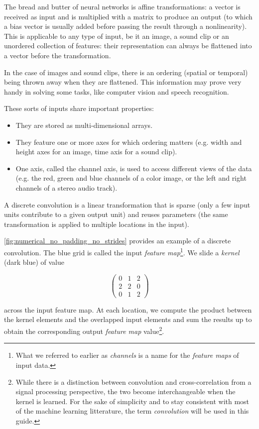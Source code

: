\documentclass{article}
\begin{document}
The bread and butter of neural networks is affine transformations: a vector is
received as input and is multiplied with a matrix to produce an output (to which
a bias vector is usually added before passing the result through a
nonlinearity). This is applicable to any type of input, be it an image, a sound
clip or an unordered collection of features: their representation can always be
flattened into a vector before the transformation.

In the case of images and sound clips, there is an ordering (spatial or
temporal) being thrown away when they are flattened. This information may prove
very handy in solving some tasks, like computer vision and speech recognition.

These sorts of inputs share important properties:

\begin{itemize}
    \item They are stored as multi-dimensional arrays.
    \item They feature one or more axes for which ordering matters (e.g. width
        and height axes for an image, time axis for a sound clip).
    \item One axis, called the channel axis, is used to access different views
        of the data (e.g. the red, green and blue channels of a color image, or
        the left and right channels of a stereo audio track).
\end{itemize}

A discrete convolution is a linear transformation that is sparse (only a few
input units contribute to a given output unit) and reuses parameters (the same
transformation is applied to multiple locations in the input).

\autoref{fig:numerical_no_padding_no_strides} provides an example of a discrete
convolution. The blue grid is called the input {\em feature map}\footnote{
    What we referred to earlier as {\em channels} is a name for the {\em feature
    maps} of input data.}.
We slide a {\em kernel} (dark blue) of value

\begin{equation}
\begin{pmatrix}
    0 & 1 & 2 \\
    2 & 2 & 0 \\
    0 & 1 & 2
\end{pmatrix}
\end{equation}

across the input feature map. At each location, we compute the product between
the kernel elements and the overlapped input elements and sum the results up
to obtain the corresponding output {\em feature map} value\footnote{
    While there is a distinction between convolution and cross-correlation from
    a signal processing perspective, the two become interchangeable when the
    kernel is learned. For the sake of simplicity and to stay consistent with
    most of the machine learning litterature, the term {\em convolution}
    will be used in this guide.}.
\end{document}
